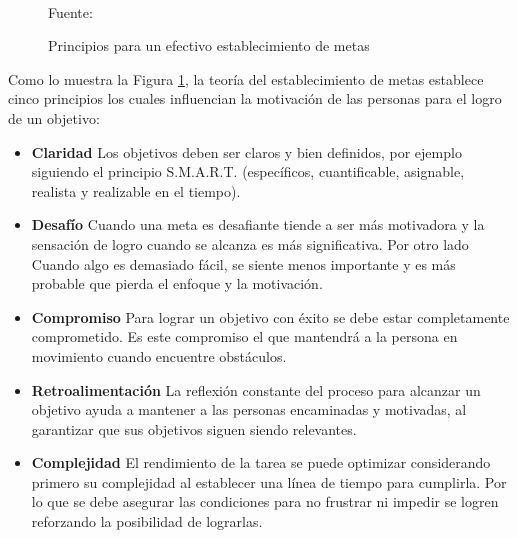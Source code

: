 \begin{figure}[ht]
\caption{Principios para un efectivo establecimiento de metas}
\label{img:goal}
\centering
{}
\\
{\footnotesize Fuente: }
\end{figure}

Como lo muestra la Figura \ref{img:goal}, la teoría del establecimiento de metas establece cinco principios 
los cuales influencian la motivación de las personas para el logro de un objetivo:

\begin{itemize}
\item \textbf{Claridad} Los objetivos deben ser claros y bien definidos, por ejemplo siguiendo el principio 
S.M.A.R.T. (específicos, cuantificable, asignable, realista y realizable en el tiempo).
\item \textbf{Desafío} Cuando una meta es desafiante tiende a ser más motivadora y la sensación de logro 
cuando se alcanza es más significativa. Por otro lado Cuando algo es demasiado fácil, se siente menos 
importante y es más probable que pierda el enfoque y la motivación.
\item \textbf{Compromiso} Para lograr un objetivo con éxito se debe estar completamente comprometido. Es este
compromiso el que mantendrá a la persona en movimiento cuando encuentre obstáculos.
\item \textbf{Retroalimentación} La reflexión constante del proceso para alcanzar un objetivo ayuda a 
mantener a las personas encaminadas y motivadas, al garantizar que sus objetivos siguen siendo relevantes.
\item \textbf{Complejidad} El rendimiento de la tarea se puede optimizar considerando primero su complejidad
al establecer una línea de tiempo para cumplirla. Por lo que se debe asegurar las condiciones para no frustrar
ni impedir se logren reforzando la posibilidad de lograrlas.
\end{itemize}

